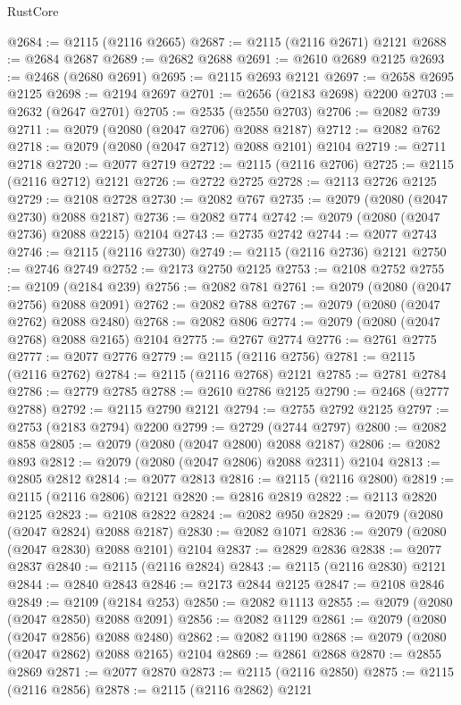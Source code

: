 \begin{lexlean}{RustCore}
\begin{coremodule}
@2684 := @2115 (@2116 @2665)
@2687 := @2115 (@2116 @2671) @2121
@2688 := @2684 @2687
@2689 := @2682 @2688
@2691 := @2610 @2689 @2125
@2693 := @2468 (@2680 @2691)
@2695 := @2115 @2693 @2121
@2697 := @2658 @2695 @2125
@2698 := @2194 @2697
@2701 := @2656 (@2183 @2698) @2200
@2703 := @2632 (@2647 @2701)
@2705 := @2535 (@2550 @2703)
@2706 := @2082 @739
@2711 := @2079 (@2080 (@2047 @2706) @2088 @2187)
@2712 := @2082 @762
@2718 := @2079 (@2080 (@2047 @2712) @2088 @2101) @2104
@2719 := @2711 @2718
@2720 := @2077 @2719
@2722 := @2115 (@2116 @2706)
@2725 := @2115 (@2116 @2712) @2121
@2726 := @2722 @2725
@2728 := @2113 @2726 @2125
@2729 := @2108 @2728
@2730 := @2082 @767
@2735 := @2079 (@2080 (@2047 @2730) @2088 @2187)
@2736 := @2082 @774
@2742 := @2079 (@2080 (@2047 @2736) @2088 @2215) @2104
@2743 := @2735 @2742
@2744 := @2077 @2743
@2746 := @2115 (@2116 @2730)
@2749 := @2115 (@2116 @2736) @2121
@2750 := @2746 @2749
@2752 := @2173 @2750 @2125
@2753 := @2108 @2752
@2755 := @2109 (@2184 @239)
@2756 := @2082 @781
@2761 := @2079 (@2080 (@2047 @2756) @2088 @2091)
@2762 := @2082 @788
@2767 := @2079 (@2080 (@2047 @2762) @2088 @2480)
@2768 := @2082 @806
@2774 := @2079 (@2080 (@2047 @2768) @2088 @2165) @2104
@2775 := @2767 @2774
@2776 := @2761 @2775
@2777 := @2077 @2776
@2779 := @2115 (@2116 @2756)
@2781 := @2115 (@2116 @2762)
@2784 := @2115 (@2116 @2768) @2121
@2785 := @2781 @2784
@2786 := @2779 @2785
@2788 := @2610 @2786 @2125
@2790 := @2468 (@2777 @2788)
@2792 := @2115 @2790 @2121
@2794 := @2755 @2792 @2125
@2797 := @2753 (@2183 @2794) @2200
@2799 := @2729 (@2744 @2797)
@2800 := @2082 @858
@2805 := @2079 (@2080 (@2047 @2800) @2088 @2187)
@2806 := @2082 @893
@2812 := @2079 (@2080 (@2047 @2806) @2088 @2311) @2104
@2813 := @2805 @2812
@2814 := @2077 @2813
@2816 := @2115 (@2116 @2800)
@2819 := @2115 (@2116 @2806) @2121
@2820 := @2816 @2819
@2822 := @2113 @2820 @2125
@2823 := @2108 @2822
@2824 := @2082 @950
@2829 := @2079 (@2080 (@2047 @2824) @2088 @2187)
@2830 := @2082 @1071
@2836 := @2079 (@2080 (@2047 @2830) @2088 @2101) @2104
@2837 := @2829 @2836
@2838 := @2077 @2837
@2840 := @2115 (@2116 @2824)
@2843 := @2115 (@2116 @2830) @2121
@2844 := @2840 @2843
@2846 := @2173 @2844 @2125
@2847 := @2108 @2846
@2849 := @2109 (@2184 @253)
@2850 := @2082 @1113
@2855 := @2079 (@2080 (@2047 @2850) @2088 @2091)
@2856 := @2082 @1129
@2861 := @2079 (@2080 (@2047 @2856) @2088 @2480)
@2862 := @2082 @1190
@2868 := @2079 (@2080 (@2047 @2862) @2088 @2165) @2104
@2869 := @2861 @2868
@2870 := @2855 @2869
@2871 := @2077 @2870
@2873 := @2115 (@2116 @2850)
@2875 := @2115 (@2116 @2856)
@2878 := @2115 (@2116 @2862) @2121

\end{coremodule}
\end{lexlean}
